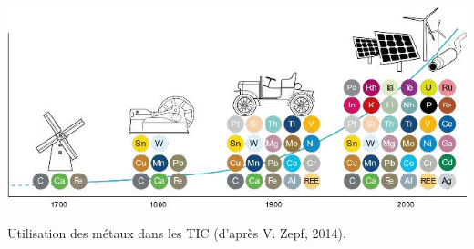 
\begin{jazzfigure}
\includegraphics[width=\linewidth]{./Images/Chapter09/figIX-06-metals-tic-zepf-2014.jpg}
\caption{\label{fig:IX.6}Utilisation des métaux dans les TIC (d'après V. Zepf, 2014).}
\end{jazzfigure}

